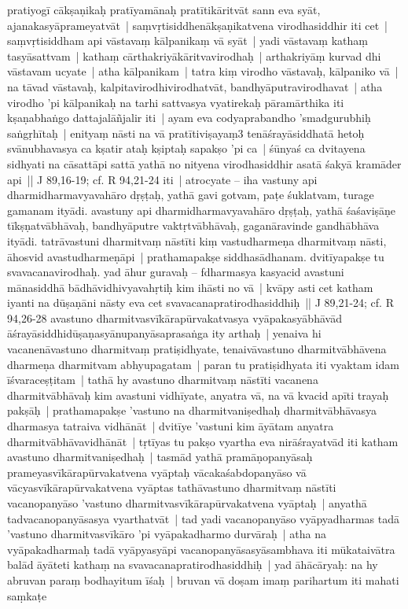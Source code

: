 \documentclass[article,12pt,a4paper]{memoir}
\begin{document}
\label{thakur75-87.13} pratiyogī cākṣaṇikaḥ pratīyamānaḥ pratītikāritvāt sann eva syāt, ajanakasyāprameyatvāt | \label{thakur75-87.15} saṃvṛtisiddhenākṣaṇikatvena virodhasiddhir iti cet | saṃvṛtisiddham api vāstavaṃ kālpanikaṃ vā syāt | \label{thakur75-87.17} yadi vāstavaṃ kathaṃ tasyāsattvam | kathaṃ cārthakriyākāritvavirodhaḥ | arthakriyāṃ kurvad dhi vāstavam ucyate | \label{thakur75-87.19} atha kālpanikam | tatra kiṃ virodho vāstavaḥ, kālpaniko vā | na tāvad vāstavaḥ, kalpitavirodhivirodhatvāt, bandhyāputravirodhavat | atha virodho 'pi kālpanikaḥ na tarhi sattvasya vyatirekaḥ pāramārthika iti kṣaṇabhaṅgo dattajalāñjalir iti | \label{thakur75-87.23} ayam eva codyaprabandho 'smadgurubhiḥ saṅgṛhītaḥ | enityaṃ nāsti na vā pratītiviṣayaṃ3 tenāśrayāsiddhatā hetoḥ svānubhavasya ca kṣatir ataḥ kṣiptaḥ sapakṣo 'pi ca | śūnyaś ca dvitayena sidhyati na cāsattāpi sattā yathā no nityena virodhasiddhir asatā śakyā kramāder api || J 89,16-19; cf. R 94,21-24 iti | \label{thakur75-87.28} atrocyate – iha vastuny api dharmidharmavyavahāro dṛṣṭaḥ, yathā gavi gotvam, paṭe śuklatvam, turage gamanam ityādi. avastuny api dharmidharmavyavahāro dṛṣṭaḥ, yathā śaśaviṣāṇe tīkṣṇatvābhāvaḥ, bandhyāputre vaktṛtvābhāvaḥ, gaganāravinde gandhābhāva ityādi. tatrāvastuni dharmitvaṃ nāstīti kiṃ vastudharmeṇa dharmitvaṃ nāsti, āhosvid avastudharmeṇāpi | \label{thakur75-88.3} prathamapakṣe siddhasādhanam. dvitīyapakṣe tu svavacanavirodhaḥ. yad āhur guravaḥ – fdharmasya kasyacid avastuni mānasiddhā bādhāvidhivyavahṛtiḥ kim ihāsti no vā | kvāpy asti cet katham iyanti na dūṣaṇāni nāsty eva cet svavacanapratirodhasiddhiḥ || J 89,21-24; cf. R 94,26-28 \label{thakur75-88.8} avastuno dharmitvasvīkārapūrvakatvasya vyāpakasyābhāvād āśrayāsiddhidūṣaṇasyānupanyāsaprasaṅga ity arthaḥ | yenaiva hi vacanenāvastuno dharmitvaṃ pratiṣidhyate, tenaivāvastuno dharmitvābhāvena dharmeṇa dharmitvam abhyupagatam | paran tu pratiṣidhyata iti vyaktam idam īśvaraceṣṭitam | tathā hy avastuno dharmitvaṃ nāstīti vacanena dharmitvābhāvaḥ kim avastuni vidhīyate, anyatra vā, na vā kvacid apīti trayaḥ pakṣāḥ | \label{thakur75-88.13} prathamapakṣe 'vastuno na dharmitvaniṣedhaḥ dharmitvābhāvasya dharmasya tatraiva vidhānāt | \label{thakur75-88.14} dvitīye 'vastuni kim āyātam anyatra dharmitvābhāvavidhānāt | \label{thakur75-88.15} tṛtīyas tu pakṣo vyartha eva nirāśrayatvād iti katham avastuno dharmitvaniṣedhaḥ | tasmād yathā pramāṇopanyāsaḥ prameyasvīkārapūrvakatvena vyāptaḥ vācakaśabdopanyāso vā vācyasvīkārapūrvakatvena vyāptas tathāvastuno dharmitvaṃ nāstīti vacanopanyāso 'vastuno dharmitvasvīkārapūrvakatvena vyāptaḥ | anyathā tadvacanopanyāsasya vyarthatvāt | \label{thakur75-88.19} tad yadi vacanopanyāso vyāpyadharmas tadā 'vastuno dharmitvasvīkāro 'pi vyāpakadharmo durvāraḥ | atha na vyāpakadharmaḥ tadā vyāpyasyāpi vacanopanyāsasyāsambhava iti mūkataivātra balād āyāteti kathaṃ na svavacanapratirodhasiddhiḥ | \label{thakur75-88.22} yad āhācāryaḥ: na hy abruvan paraṃ bodhayitum īśaḥ | bruvan vā doṣam imaṃ parihartum iti mahati saṃkaṭe 
\end{document}
